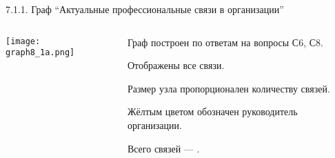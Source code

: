 \begin{frame}{7.1.1. Граф ``Актуальные профессиональные связи в организации''}

\begin{columns} 
\begin{column}{0.75\textwidth} 
\centering
          \texttt{[image: graph8\_1a.png]}
\end{column}
\begin{column}{0.25\textwidth} 

\tiny
Граф построен по ответам на вопросы С6, С8.
\smallskip

Отображены все связи. 
\smallskip

Размер узла пропорционален количеству связей.
\smallskip

Жёлтым цветом обозначен руководитель организации.
\bigskip

Всего связей --- \valHAAlinks.

\end{column}
\end{columns}
\end{frame}


